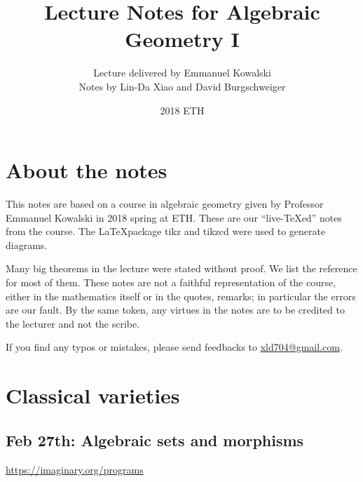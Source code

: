 \documentclass[11pt]{article}
\title{\bf Lecture Notes for Algebraic Geometry I}
\author{Lecture delivered by Emmanuel Kowalski\\
Notes by Lin-Da Xiao and David Burgschweiger}
\date{2018 ETH}
\theoremstyle{definition}
\begin{document}
\maketitle
\tableofcontents
\section*{About the notes}
This notes are based on a course in algebraic geometry given by Professor Emmanuel Kowalski in 2018 spring at ETH.
These are our ``live-{\TeX}ed'' notes from the course. The \LaTeX package tikz and tikzcd were used to generate diagrams.

Many big theorems in the lecture were stated without proof. We list the reference for most of them.
These notes are not a faithful representation of the course, either in the mathematics itself or in the quotes, remarks; in particular the errors are our fault. By the same token, any virtues in the notes are to be credited to the lecturer and not the scribe.

If you find any typos or mistakes, please send feedbacks to \href{mailto:xld704@gmail.com}{xld704@gmail.com}.
\newpage
\section{Classical varieties}
\subsection{Feb 27th: Algebraic sets and morphisms}
\href{https://imaginary.org/programs}{https://imaginary.org/programs}
\end{document}
